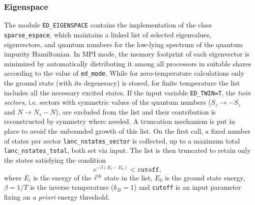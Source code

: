 \documentclass[edipack_sp.tex]{subfiles}
\begin{document}
\subsubsection{Eigenspace}\label{CodeEigenspace}
The module {\tt ED\_EIGENSPACE} contains the implementation of the 
class {\tt sparse\_espace}, which maintains a linked list 
of selected eigenvalues, eigenvectors, and quantum numbers for the 
low-lying spectrum of the quantum impurity Hamiltonian. 
In MPI mode, the memory footprint of each eigenvector 
is minimized by automatically distributing it among all processors in suitable shares
according to the value of {\tt ed\_mode}. 
While for zero-temperature calculations only the ground state (with its
degeneracy) is stored, for finite temperature the list includes all the necessary excited states.
If the input variable {\tt ED\_TWIN=T}, the {\it twin sectors}, i.e. sectors with symmetric values of the quantum numbers ($S_z\to -S_z$ and $N\to N_s-N$), are excluded from the list and their contribution is reconstructed by symmetry where needed. 
A truncation mechanism is put in place to avoid the unbounded growth of this list. On the first call, a fixed number of
states per sector  
\texttt{lanc\_nstates\_sector} is collected, up to a
maximum total \texttt{lanc\_nstates\_total}, both set via input.  
The list is then truncated to retain only the states satisfying the condition 
$$
e^{-\beta(E_i-E_0)} < \mathtt{cutoff}, 
$$
where
$E_i$ is the energy of the $i^{\rm th}$ state in the list, $E_0$ is the
ground state energy, $\beta=1/T$ is the inverse temperature ($k_B=1$) and \texttt{cutoff} is an input parameter fixing an {\it a priori} energy threshold.
\end{document}
